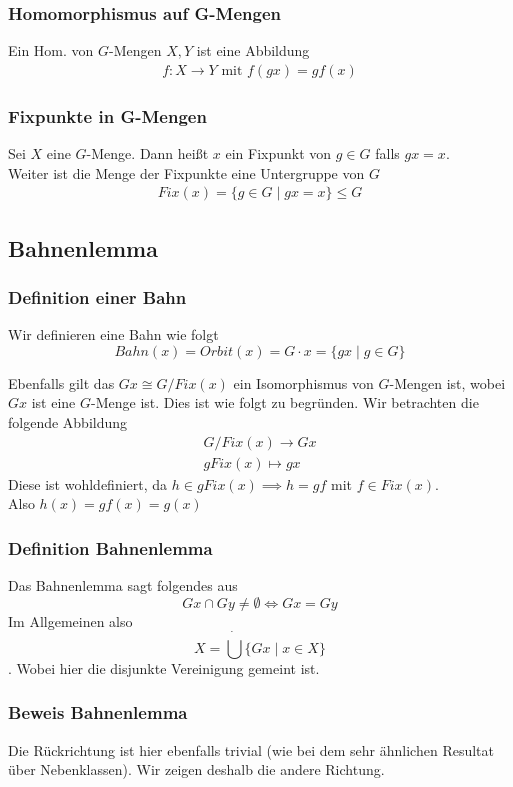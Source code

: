 \documentclass[12pt, german]{article}
\begin{document}
\subsubsection{Homomorphismus auf G-Mengen}
	Ein Hom. von $G$-Mengen $X,Y$ ist eine Abbildung 
	\begin{align*}
		f: X \to Y \text{ mit } f(gx) = gf(x)
	\end{align*}

\subsubsection{Fixpunkte in G-Mengen}
	Sei $X$ eine  $G$-Menge. Dann heißt $x$ ein Fixpunkt von $g \in G$ falls $gx=x$. \\
	Weiter ist die Menge der Fixpunkte eine Untergruppe von $G$
	\begin{align*}
		Fix(x) = \{g \in G \mid  gx = x\} \leq G 
	\end{align*}


\subsection{Bahnenlemma}		
\subsubsection{Definition einer Bahn}
	Wir definieren eine Bahn wie folgt $$Bahn(x) = Orbit(x) = G\cdot x = \{gx \mid  g \in G \}$$
	
	
	Ebenfalls gilt das $Gx \cong G/Fix(x)$ ein Isomorphismus von $G$-Mengen ist, wobei $Gx$ ist eine $G$-Menge ist. 
	Dies ist wie folgt zu begründen. Wir betrachten die folgende Abbildung
	\begin{align*}
		G/Fix(x) \to Gx \\ 
		gFix(x) \mapsto gx
	 \end{align*}
	 Diese ist wohldefiniert, da $h \in gFix(x) \implies h=gf$ mit $f \in Fix(x)$. \\ 
	 Also $h(x) = gf(x) = g(x)$ 


\subsubsection{Definition Bahnenlemma}
	Das Bahnenlemma sagt folgendes aus $$Gx \cap Gy \not = \emptyset \iff Gx = Gy$$
	Im Allgemeinen also $$ X = \dot{\bigcup} \{Gx \mid  x \in X \}$$. Wobei hier die disjunkte Vereinigung gemeint ist. 
\subsubsection{Beweis Bahnenlemma}
	Die Rückrichtung ist hier ebenfalls trivial (wie bei dem sehr ähnlichen Resultat über Nebenklassen). Wir zeigen deshalb die andere Richtung. \\ 
	
\end{document}
